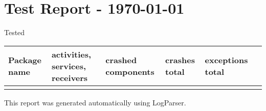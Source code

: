 \documentclass{scrartcl}
\begin{document}
\section*{Test Report - \today }
Tested %
\begin{footnotesize}
\begin{longtable}{| p{} | p{} | p{} | p{} | p{} | p{} |}
\hline
\textbf{Package name} & \textbf{activities, services, receivers} & \textbf{crashed components} & \textbf{crashes total} & \textbf{exceptions total} \\
\hline
\endhead
\hline
\endfoot
\end{longtable}
This report was generated automatically using LogParser.
\end{footnotesize}
\end{document}
